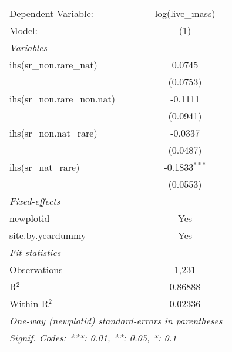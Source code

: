 \begin{tabular}{lc}
\tabularnewline\midrule\midrule
Dependent Variable:&log(live\_mass)\\
Model:&(1)\\
\midrule \emph{Variables}&  \\
ihs(sr\_non.rare\_nat)&0.0745\\
  &(0.0753)\\
ihs(sr\_non.rare\_non.nat)&-0.1111\\
  &(0.0941)\\
ihs(sr\_non.nat\_rare)&-0.0337\\
  &(0.0487)\\
ihs(sr\_nat\_rare)&-0.1833$^{***}$\\
  &(0.0553)\\
\midrule \emph{Fixed-effects}&  \\
newplotid & Yes\\
site.by.yeardummy & Yes\\
\midrule \emph{Fit statistics}&  \\
Observations & 1,231\\
R$^2$ & 0.86888\\
Within R$^2$ & 0.02336\\
\midrule\midrule\multicolumn{2}{l}{\emph{One-way (newplotid) standard-errors in parentheses}}\\
\multicolumn{2}{l}{\emph{Signif. Codes: ***: 0.01, **: 0.05, *: 0.1}}\\
\end{tabular}


